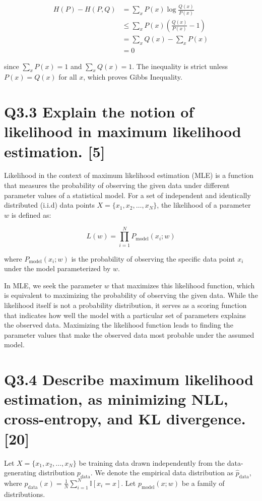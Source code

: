 \documentclass[11pt]{article}
\begin{document}
\begin{align*}
H(P) - H(P,Q) &= \sum_x P(x) \log \frac{Q(x)}{P(x)} \\
&\leq \sum_x P(x) \left( \frac{Q(x)}{P(x)} - 1 \right) \\
&= \sum_x Q(x) - \sum_x P(x) \\
&= 0
\end{align*}

since \( \sum_x P(x) = 1 \) and \( \sum_x Q(x) = 1 \). The inequality is strict unless \( P(x) = Q(x) \) for all \( x \), which proves Gibbs Inequality.


\section{Q3.3 Explain the notion of likelihood in maximum likelihood estimation. [5]}

Likelihood in the context of maximum likelihood estimation (MLE) is a function that measures the probability of observing the given data under different parameter values of a statistical model. For a set of independent and identically distributed (i.i.d) data points \( X = \{x_1, x_2, \ldots, x_N\} \), the likelihood of a parameter \( w \) is defined as:

\[
L(w) = \prod_{i=1}^{N} P_{\text{model}}(x_i; w)
\]

where \( P_{\text{model}}(x_i; w) \) is the probability of observing the specific data point \( x_i \) under the model parameterized by \( w \).

In MLE, we seek the parameter \( w \) that maximizes this likelihood function, which is equivalent to maximizing the probability of observing the given data. While the likelihood itself is not a probability distribution, it serves as a scoring function that indicates how well the model with a particular set of parameters explains the observed data. Maximizing the likelihood function leads to finding the parameter values that make the observed data most probable under the assumed model.


\section{Q3.4 Describe maximum likelihood estimation, as minimizing NLL, cross-entropy, and KL divergence. [20]}

Let \( X = \{x_1, x_2, \ldots, x_N\} \) be training data drawn independently from the data-generating distribution \( p_{\text{data}} \). We denote the empirical data distribution as \( \hat{p}_{\text{data}} \), where \( \hat{p}_{\text{data}}(x) = \frac{1}{N} \sum_{i=1}^{N} \mathbb{I}[x_i = x] \). Let \( p_{\text{model}}(x; w) \) be a family of distributions.
\end{document}
